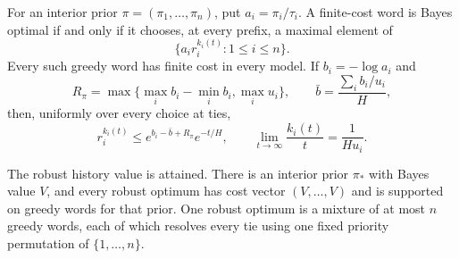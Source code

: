 \begin{lemma}
\label{lem:r80-finite-search-saddle}
For an interior prior $\pi=(\pi_1,\ldots,\pi_n)$, put
$a_i=\pi_i/\tau_i$.  A finite-cost word is Bayes optimal if and only if
it chooses, at every prefix, a maximal element of
\begin{equation}\label{eq:r80-finite-search-indices}
 \{a_i r_i^{k_i(t)}:1\le i\le n\}.
\end{equation}
Every such greedy word has finite cost in every model.  If
$b_i=-\log a_i$ and
\[
 R_\pi=\max\{\max_i b_i-\min_i b_i,\max_i u_i\},
 \qquad \bar b=\frac{\sum_i b_i/u_i}{H},
\]
then, uniformly over every choice at ties,
\begin{equation}\label{eq:r80-finite-search-tail-frequency}
 r_i^{k_i(t)}\le e^{b_i-\bar b+R_\pi}e^{-t/H},
 \qquad
 \lim_{t\to\infty}\frac{k_i(t)}t=\frac1{Hu_i}.
\end{equation}

The robust history value is attained.  There is an interior prior
$\pi_*$ with Bayes value $V$, and every robust optimum has cost vector
$(V,\ldots,V)$ and is supported on greedy words for that prior.
One robust optimum is a mixture of at most $n$ greedy words, each of
which resolves every tie using one fixed priority permutation of
$\{1,\ldots,n\}$.
\end{lemma}
